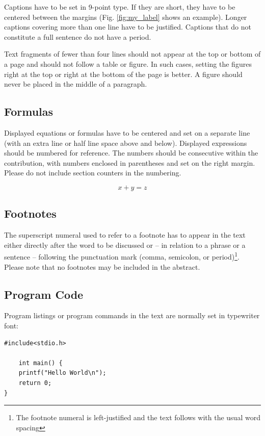 \documentclass{llncs}
\begin{document}
Captions have to be set in 9-point type. If they are short, they have to be centered between the margins (Fig. \ref{fig:my_label} shows an example). Longer captions covering more than one line have to be justified. Captions that do not constitute a full sentence do not have a period.

Text fragments of fewer than four lines should not appear at the top or bottom of a page and should not follow a table or figure. In such cases, setting the figures right at the top or right at the bottom of the page is better. A figure should never be placed in the middle of a paragraph.

\subsection{Formulas}
Displayed equations or formulas have to be centered and set on a separate line (with an extra line or half line space above and below). Displayed expressions should be numbered for reference. The numbers should be consecutive within the contribution, with numbers enclosed in parentheses and set on the right margin. Please do not include section counters in the numbering.

\begin{equation}
    x + y = z
\end{equation}

\subsection{Footnotes}
The superscript numeral used to refer to a footnote has to appear in the text either directly after the word to be discussed or – in relation to a phrase or a sentence – following the punctuation mark (comma, semicolon, or period)\footnote{The footnote numeral is left-justified and the text follows with the usual word spacing }.  
Please note that no footnotes may be included in the abstract.

\subsection{Program Code}
Program listings or program commands in the text are normally set in typewriter font: 

\begin{lstlisting}
#include<stdio.h>

    int main() {
	printf("Hello World\n");
	return 0;
}
\end{lstlisting}
\end{document}
